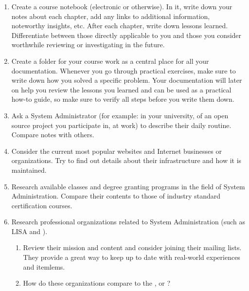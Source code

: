 \begin{enumerate}

\item Create a course notebook (electronic or
otherwise).  In it, write down your notes about each
chapter, add any links to additional information,
noteworthy insights, etc.  After each chapter, write
down lessons learned.  Differentiate between those
directly applicable to you and those you consider
worthwhile reviewing or investigating in the future.

\item Create a folder for your course work as a
central place for all your documentation.  Whenever
you go through practical exercises, make sure to write
down how you solved a specific problem.  Your
documentation will later on help you review the
lessons you learned and can be used as a practical
how-to guide, so make sure to verify all steps before
you write them down.

\item Ask a System Administrator (for example: in your
university, of an open source project you participate
in, at work) to describe their daily routine.  Compare
notes with others.

\item Consider the current most popular websites and
Internet businesses or organizations.  Try to find out
details about their infrastructure and how it is
maintained.

\item Research available classes and degree granting
programs in the field of System Administration.
Compare their contents to those of industry standard
certification courses.

\item Research professional organizations related to
System Administration (such as LISA and
).

\begin{enumerate}

\item Review their mission and content and consider
joining their mailing lists.  They provide a great way
to keep up to date with real-world experiences and
itemlems.

\item How do these organizations compare to the
,  or
?

\end{enumerate}


\end{enumerate}
